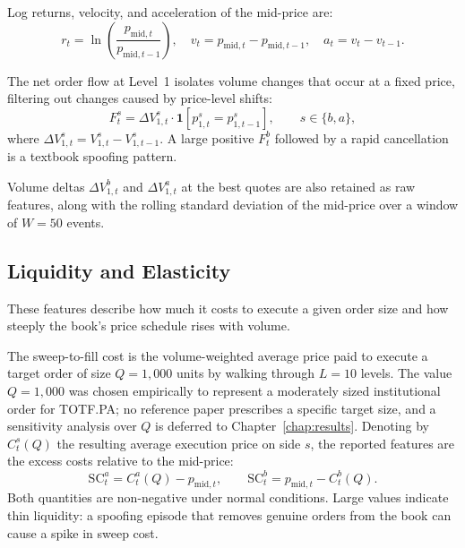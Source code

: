\documentclass[11pt]{report}
\begin{document}
Log returns, velocity, and acceleration of the mid-price are:
\begin{equation}
  \label{eq:log_return}
  r_t = \ln\!\left(\frac{p_{\text{mid},t}}{p_{\text{mid},t-1}}\right), \quad
  v_t = p_{\text{mid},t} - p_{\text{mid},t-1}, \quad
  a_t = v_t - v_{t-1}.
\end{equation}

The net order flow at Level~1 isolates volume changes that occur at a fixed price, filtering out changes caused by price-level shifts:
\begin{equation}
  \label{eq:net_flow}
  F^s_t = \Delta V^s_{1,t} \cdot \mathbf{1}\!\left[p^s_{1,t} = p^s_{1,t-1}\right], \qquad s \in \{b, a\},
\end{equation}
where $\Delta V^s_{1,t} = V^s_{1,t} - V^s_{1,t-1}$.
A large positive $F^b_t$ followed by a rapid cancellation is a textbook spoofing pattern.

Volume deltas $\Delta V^b_{1,t}$ and $\Delta V^a_{1,t}$ at the best quotes are also retained as raw features, along with the rolling standard deviation of the mid-price over a window of $W = 50$ events.


\subsection{Liquidity and Elasticity}\label{subsec:features:liquidity}

These features describe how much it costs to execute a given order size and how steeply the book's price schedule rises with volume.

The sweep-to-fill cost is the volume-weighted average price paid to execute a target order of size $Q = 1{,}000$ units by walking through $L = 10$ levels. The value $Q = 1{,}000$ was chosen empirically to represent a moderately sized institutional order for TOTF.PA; no reference paper prescribes a specific target size, and a sensitivity analysis over $Q$ is deferred to Chapter~\ref{chap:results}. Denoting by $C^s_t(Q)$ the resulting average execution price on side $s$, the reported features are the excess costs relative to the mid-price:
\begin{equation}
  \label{eq:sweep_cost}
  \text{SC}^a_t = C^a_t(Q) - p_{\text{mid},t}, \qquad
  \text{SC}^b_t = p_{\text{mid},t} - C^b_t(Q).
\end{equation}
Both quantities are non-negative under normal conditions. Large values indicate thin liquidity: a spoofing episode that removes genuine orders from the book can cause a spike in sweep cost.
\end{document}
